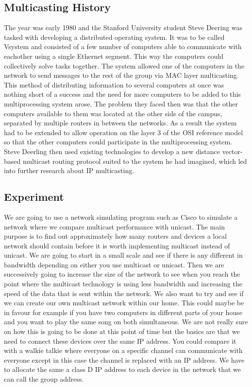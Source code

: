 \documentclass[9pt,a4paper]{acmproc}
\begin{document}
\subsection{Multicasting History}

The year was early 1980 and the Stanford University student Steve Deering was tasked with developing a distributed operating system. It was to be called Vsystem and consisted of a few number of computers able to communicate with eachother using a single Ethernet segment. This way the computers could collectively solve tasks together. The system allowed one of the computers in the network to send messages to the rest of the group via MAC layer multicasting. This method of distributing information to several computers at once was nothing short of a success and the need for more computers to be added to this multiprocessing system arose. The problem they faced then was that the other computers available to them was located at the other side of the campus, separated by multiple routers in between the networks. As a result the system had to be extended to allow operation on the layer 3 of the OSI reference model so that the other computers could participate in the multiprocessing system. Steve Deerling then used existing technologies to develop a new distance vector-based multicast routing protocol suited to the system he had imagined, which led into further research about IP multicasting. \cite[s.~7]{briefHist}


\subsection{Experiment}

We are going to use a network simulating program such as Cisco to simulate a network where we compare multicast performance with unicast. The main purpose is to find out approximately how many routers and devices a local network should contain before it is worth implementing multicast instead of unicast. We are going to start in a small scale and see if there is any different in bandwidth depending on either you use multicast or unicast. Then we are successively going to increase the size of the network to see when you reach the point where the multicast technology is using less bandwidth and increasing the speed of the data that is sent within the network.
We also want to try and see if we can create our own multicast network within our home. This could maybe be in favour for example if you have two computers in different parts of your house and you want to play the same song on both simultaneous. We are not really sure on how this is going to be done at this point of time but the basics are that we need to connect these devices over the same IP address. You could compare it with a walkie talkie where everyone on a specific channel can communicate with everyone except in this case the channel is replaced with an IP address. We have to allocate the same a class D IP address to each device in the network that we can call the group address.
\end{document}
